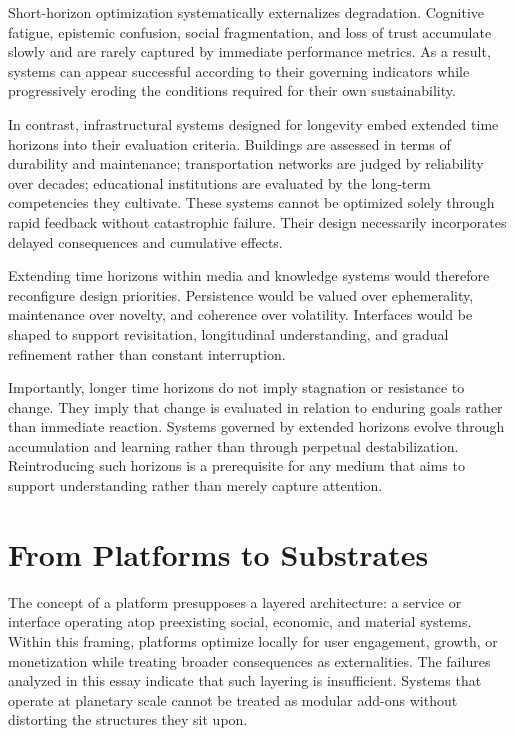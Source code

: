 \documentclass[12pt]{article}
\begin{document}
Short-horizon optimization systematically externalizes degradation. Cognitive fatigue, epistemic confusion, social fragmentation, and loss of trust accumulate slowly and are rarely captured by immediate performance metrics. As a result, systems can appear successful according to their governing indicators while progressively eroding the conditions required for their own sustainability.

In contrast, infrastructural systems designed for longevity embed extended time horizons into their evaluation criteria. Buildings are assessed in terms of durability and maintenance; transportation networks are judged by reliability over decades; educational institutions are evaluated by the long-term competencies they cultivate. These systems cannot be optimized solely through rapid feedback without catastrophic failure. Their design necessarily incorporates delayed consequences and cumulative effects.

Extending time horizons within media and knowledge systems would therefore reconfigure design priorities. Persistence would be valued over ephemerality, maintenance over novelty, and coherence over volatility. Interfaces would be shaped to support revisitation, longitudinal understanding, and gradual refinement rather than constant interruption.

Importantly, longer time horizons do not imply stagnation or resistance to change. They imply that change is evaluated in relation to enduring goals rather than immediate reaction. Systems governed by extended horizons evolve through accumulation and learning rather than through perpetual destabilization. Reintroducing such horizons is a prerequisite for any medium that aims to support understanding rather than merely capture attention.

\section{From Platforms to Substrates}

The concept of a platform presupposes a layered architecture: a service or interface operating atop preexisting social, economic, and material systems. Within this framing, platforms optimize locally for user engagement, growth, or monetization while treating broader consequences as externalities. The failures analyzed in this essay indicate that such layering is insufficient. Systems that operate at planetary scale cannot be treated as modular add-ons without distorting the structures they sit upon.
\end{document}
